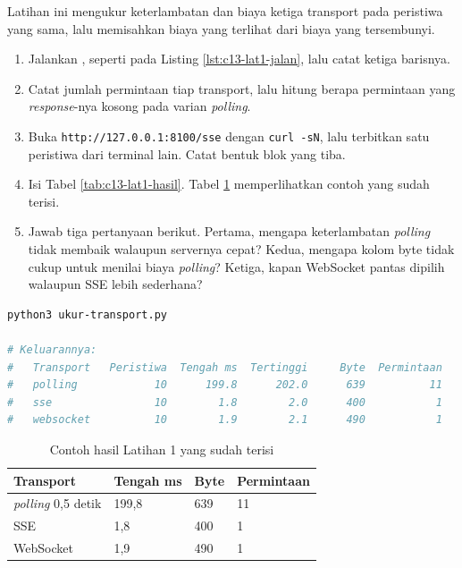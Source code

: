 Latihan ini mengukur keterlambatan dan biaya ketiga transport pada peristiwa
yang sama, lalu memisahkan biaya yang terlihat dari biaya yang tersembunyi.

\begin{enumerate}
  \item Jalankan , seperti pada Listing
        \ref{lst:c13-lat1-jalan}, lalu catat ketiga barisnya.
  \item Catat jumlah permintaan tiap transport, lalu hitung berapa permintaan
        yang \textit{response}-nya kosong pada varian \textit{polling}.
  \item Buka \texttt{http://127.0.0.1:8100/sse} dengan \texttt{curl -sN},
        lalu terbitkan satu peristiwa dari terminal lain. Catat bentuk blok
        yang tiba.
  \item Isi Tabel \ref{tab:c13-lat1-hasil}. Tabel \ref{tab:c13-lat1-contoh}
        memperlihatkan contoh yang sudah terisi.
  \item Jawab tiga pertanyaan berikut. Pertama, mengapa keterlambatan
        \textit{polling} tidak membaik walaupun servernya cepat? Kedua,
        mengapa kolom byte tidak cukup untuk menilai biaya \textit{polling}?
        Ketiga, kapan WebSocket pantas dipilih walaupun SSE lebih sederhana?
\end{enumerate}

\begin{lstlisting}[language=bash, caption={Mengukur ketiga transport, tersedia di \berkas{sources/chapter13/ukur-transport.py}}, label={lst:c13-lat1-jalan}]
python3 ukur-transport.py

# Keluarannya:
#   Transport   Peristiwa  Tengah ms  Tertinggi     Byte  Permintaan
#   polling            10      199.8      202.0      639          11
#   sse                10        1.8        2.0      400           1
#   websocket          10        1.9        2.1      490           1
\end{lstlisting}

\begin{table}[!htb]
  \centering
  \caption{Contoh hasil Latihan 1 yang sudah terisi}
  \label{tab:c13-lat1-contoh}
  \begin{tabularx}{\textwidth}{Xlll}
    \hline
    \textbf{Transport} & \textbf{Tengah ms} & \textbf{Byte} & \textbf{Permintaan} \\
    \hline
    \textit{polling} 0,5 detik & 199,8 & 639 & 11 \\
    \hline
    SSE & 1,8 & 400 & 1 \\
    \hline
    WebSocket & 1,9 & 490 & 1 \\
    \hline
  \end{tabularx}
\end{table}


